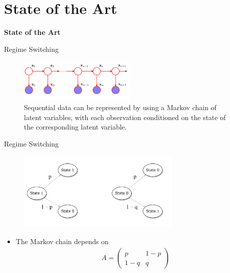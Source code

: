 
\section{State of the Art}
\begin{frame}[noframenumbering]
	\begin{center}
	    \textbf{\huge{State of the Art}}
	\end{center}
\end{frame}

\begin{frame}{Regime Switching}
\begin{figure}[h!]
    \centering
    \includegraphics[width=0.5\textwidth]{Figures/hmm1.png}
    \caption{ Sequential data can be represented by using a Markov chain of latent variables, with each observation conditioned on the state of the corresponding latent variable.}
\end{figure}
\end{frame}


\begin{frame}{Regime Switching}
\begin{figure}[h!]
    \centering
    \includegraphics[width=0.7\textwidth]{Figures/markov_chain.jpg}
\end{figure}
\begin{itemize}
    \item The Markov chain depends on 
    \begin{align*}
    A = 
        \begin{pmatrix}
            p & 1-p\\
            1-q & q
        \end{pmatrix}
    \end{align*}
\end{itemize}
\end{frame}


